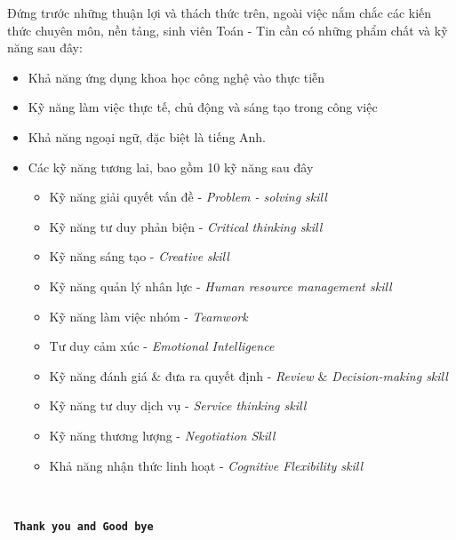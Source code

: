\documentclass[12pt,a4paper]{report}
\begin{document}
        Đứng trước những thuận lợi và thách thức trên, ngoài việc nắm chắc các kiến thức chuyên môn, nền tảng, sinh viên Toán - Tin cần có những phẩm chất và kỹ năng sau đây:
        
        \begin{itemize}
            \item Khả năng ứng dụng khoa học công nghệ vào thực tiễn
            \item Kỹ năng làm việc thực tế, chủ động và sáng tạo trong công việc
            \item Khả năng ngoại ngữ, đặc biệt là tiếng Anh.
            \item Các kỹ năng tương lai, bao gồm 10 kỹ năng sau đây
            \begin{itemize}
                \item Kỹ năng giải quyết vấn đề - \textit{Problem - solving skill}
                \item Kỹ năng tư duy phản biện - \textit{Critical thinking skill}
                \item Kỹ năng sáng tạo - \textit{Creative skill}
                \item Kỹ năng quản lý nhân lực - \textit{Human resource management skill}
                \item Kỹ năng làm việc nhóm - \textit{Teamwork}
                \item Tư duy cảm xúc - \textit{Emotional Intelligence}
                \item Kỹ năng đánh giá $\&$ đưa ra quyết định - \textit{Review $\&$ Decision-making skill}
                \item Kỹ năng tư duy dịch vụ - \textit{Service thinking skill}
                \item Kỹ năng thương lượng - \textit{Negotiation Skill}
                \item Khả năng nhận thức linh hoạt - \textit{Cognitive Flexibility skill}
            \end{itemize}
            
            
        \end{itemize}
        
        
    \textbf{{\large}}\\[3cm]
    \begin{center}
        \Huge \texttt{ \textbf{Thank you and Good bye} }
    \end{center}
    
\end{document}
